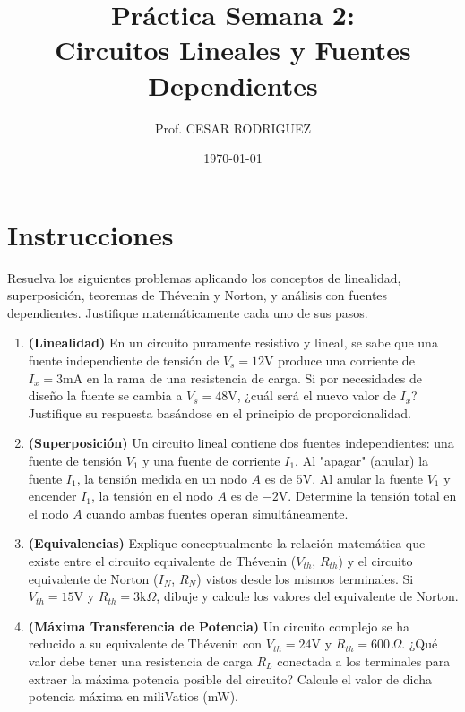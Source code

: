 \documentclass[12pt, a4paper]{article}
\title{\textbf{Práctica Semana 2: \\ Circuitos Lineales y Fuentes Dependientes}}
\author{Prof. CESAR RODRIGUEZ}
\date{\today}
\begin{document}
\maketitle

\section*{Instrucciones}
Resuelva los siguientes problemas aplicando los conceptos de linealidad, superposición, teoremas de Thévenin y Norton, y análisis con fuentes dependientes. Justifique matemáticamente cada uno de sus pasos.

\vspace{0.5cm}

\begin{enumerate}[leftmargin=*, itemsep=1.5em]

    \item \textbf{(Linealidad)} En un circuito puramente resistivo y lineal, se sabe que una fuente independiente de tensión de $V_s = 12\text{V}$ produce una corriente de $I_x = 3\text{mA}$ en la rama de una resistencia de carga. Si por necesidades de diseño la fuente se cambia a $V_s = 48\text{V}$, ¿cuál será el nuevo valor de $I_x$? Justifique su respuesta basándose en el principio de proporcionalidad.

    \item \textbf{(Superposición)} Un circuito lineal contiene dos fuentes independientes: una fuente de tensión $V_1$ y una fuente de corriente $I_1$. Al "apagar" (anular) la fuente $I_1$, la tensión medida en un nodo $A$ es de $5\text{V}$. Al anular la fuente $V_1$ y encender $I_1$, la tensión en el nodo $A$ es de $-2\text{V}$. Determine la tensión total en el nodo $A$ cuando ambas fuentes operan simultáneamente.

    \item \textbf{(Equivalencias)} Explique conceptualmente la relación matemática que existe entre el circuito equivalente de Thévenin ($V_{th}$, $R_{th}$) y el circuito equivalente de Norton ($I_N$, $R_N$) vistos desde los mismos terminales. Si $V_{th} = 15\text{V}$ y $R_{th} = 3\text{k}\Omega$, dibuje y calcule los valores del equivalente de Norton.

    \item \textbf{(Máxima Transferencia de Potencia)} Un circuito complejo se ha reducido a su equivalente de Thévenin con $V_{th} = 24\text{V}$ y $R_{th} = 600\,\Omega$. ¿Qué valor debe tener una resistencia de carga $R_L$ conectada a los terminales para extraer la máxima potencia posible del circuito? Calcule el valor de dicha potencia máxima en miliVatios (mW).


\end{enumerate}
\end{document}
